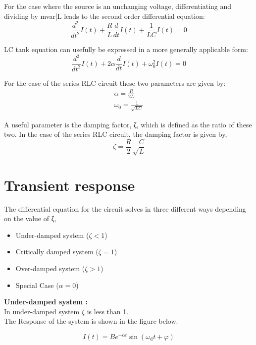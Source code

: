 \documentclass[11pt]{article}
\begin{document}
For the case where the source is an unchanging voltage, differentiating and dividing by {{mvar|L}} leads to the second order differential equation:
\begin{equation}
\frac{d^2}{dt^2}I(t) + \frac{R}{L} \frac{d}{dt}I(t) + \frac{1}{LC} I(t) = 0
\label{eom}
\end{equation}

LC tank equation can usefully be expressed in a more generally applicable form:
\begin{equation}
\frac{d^2}{dt^2}I(t) + 2 \alpha \frac{d}{dt}I(t) + \omega_0^2 I(t) = 0
\label{diff_eqn}
\end{equation}

For the case of the series RLC circuit these two parameters are given by:
\begin{eqnarray}
\alpha = \frac{R}{2L} \\
\label{def_zeta}
\omega_0 = \frac{1}{\sqrt{LC}}
\label{def_omega}
\end{eqnarray}

A useful parameter is the damping factor, ζ, which is defined as the ratio of these two. In the case of the series RLC circuit, the damping factor is given by,
\begin{equation}
\zeta = \frac{R}{2} \sqrt\frac{C}{L}
\label{damp_fac}
\end{equation}


\section{Transient response}

The differential equation for the circuit solves in three different ways depending on the value of ζ,

\begin{itemize}
	\item{Under-damped system ($\zeta < 1$)}
	\item{Critically damped system ($\zeta = 1$)}
	\item{Over-damped system ($\zeta > 1$)}
	\item{Special Case ($\alpha = 0$)}
\end{itemize}

\newpage
\noindent\textbf{Under-damped system :} \\
In under-damped system $\zeta$ is less than 1. \\
The Response of the system is shown in the figure below.

\begin{equation}
I(t) = B e^{-\alpha t} \sin (\omega_\mathrm{d} t + \varphi)
\label{under-damped-eqn}
\end{equation}
\end{document}
